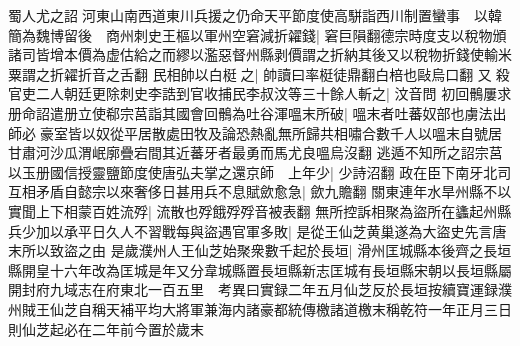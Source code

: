 蜀人尤之詔河東山南西道東川兵援之仍命天平節度使高駢詣西川制置蠻事　以韓簡為魏博留後　商州刺史王樞以軍州空窘減折糴錢|{
	窘巨隕翻德宗時度支以稅物頒諸司皆增本價為虚估給之而繆以濫惡督州縣剥價謂之折納其後又以稅物折錢使輸米粟謂之折糴折音之舌翻}
民相帥以白梃之|{
	帥讀曰率梃徒鼎翻白棓也敺烏口翻}
又殺官吏二人朝廷更除刺史李誥到官收捕民李叔汶等三十餘人斬之|{
	汶音問}
初回鶻屢求册命詔遣册立使郗宗莒詣其國會回鶻為吐谷渾嗢末所破|{
	嗢末者吐蕃奴部也虜法出師必豪室皆以奴從平居散處田牧及論恐熱亂無所歸共相嘯合數千人以嗢末自號居甘肅河沙瓜渭岷廓疊宕間其近蕃牙者最勇而馬尤良嗢烏沒翻}
逃遁不知所之詔宗莒以玉册國信授靈鹽節度使唐弘夫掌之還京師　上年少|{
	少詩沼翻}
政在臣下南牙北司互相矛盾自懿宗以來奢侈日甚用兵不息賦歛愈急|{
	歛九贍翻}
關東連年水旱州縣不以實聞上下相蒙百姓流殍|{
	流散也殍餓殍殍音被表翻}
無所控訴相聚為盜所在蠭起州縣兵少加以承平日久人不習戰每與盜遇官軍多敗|{
	是從王仙芝黄巢遂為大盜史先言唐末所以致盜之由}
是歲濮州人王仙芝始聚衆數千起於長垣|{
	滑州匡城縣本後齊之長垣縣開皇十六年改為匡城是年又分韋城縣置長垣縣新志匡城有長垣縣宋朝以長垣縣屬開封府九域志在府東北一百五里　考異曰實録二年五月仙芝反於長垣按續寶運録濮州賊王仙芝自稱天補平均大將軍兼海内諸豪都統傳檄諸道檄末稱乾符一年正月三日則仙芝起必在二年前今置於歲末}


